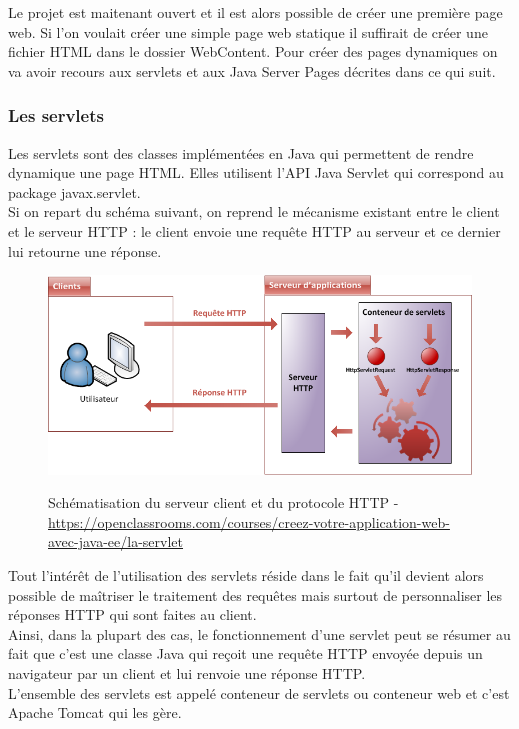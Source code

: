 Le projet est maitenant ouvert et il est alors possible de créer une première page web. Si l'on voulait créer une simple page web statique il suffirait de créer une fichier HTML dans le dossier WebContent. Pour créer des pages dynamiques on va avoir recours aux servlets et aux Java Server Pages décrites dans ce qui suit.


\subsubsection{Les servlets}
Les servlets sont des classes implémentées en Java qui permettent de rendre dynamique une page HTML. Elles utilisent l'API Java Servlet qui correspond au package javax.servlet.\\

Si on repart du schéma suivant, on reprend le mécanisme existant entre le client et le serveur HTTP : le client envoie une requête HTTP au serveur et ce dernier lui retourne une réponse.\\
\begin{figure}[H]
  \center
  \includegraphics[scale=0.5]{../graph/serveurclient.png} \\
  \caption{Schématisation du serveur client et du protocole HTTP - \url{https://openclassrooms.com/courses/creez-votre-application-web-avec-java-ee/la-servlet}}
\end{figure}

Tout l'intérêt de l'utilisation des servlets réside dans le fait qu'il devient alors possible de maîtriser le traitement des requêtes mais surtout de personnaliser les réponses HTTP qui sont faites au client.\\
Ainsi, dans la plupart des cas, le fonctionnement d'une servlet peut se résumer au fait que c'est une classe Java qui reçoit une requête HTTP envoyée depuis un navigateur par un client et lui renvoie une réponse HTTP.\\
L'ensemble des servlets est appelé conteneur de servlets ou conteneur web et c'est Apache Tomcat qui les gère.

